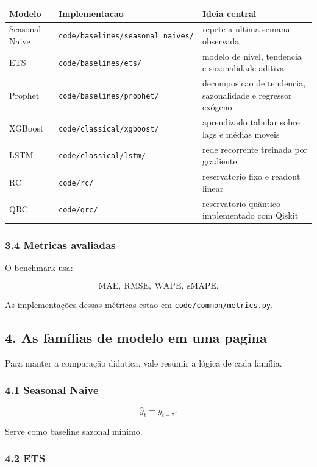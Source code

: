 \documentclass[12pt]{article}
\begin{document}
\begin{longtable}[]{@{}lll@{}}
\toprule\noalign{}
Modelo & Implementacao & Ideia central \\
\midrule\noalign{}
\endhead
\bottomrule\noalign{}
\endlastfoot
Seasonal Naive & \texttt{code/baselines/seasonal\_naives/} & repete a ultima semana observada \\
ETS & \texttt{code/baselines/ets/} & modelo de nivel, tendencia e sazonalidade aditiva \\
Prophet & \texttt{code/baselines/prophet/} & decomposicao de tendencia, sazonalidade e regressor exógeno \\
XGBoost & \texttt{code/classical/xgboost/} & aprendizado tabular sobre lags e médias moveis \\
LSTM & \texttt{code/classical/lstm/} & rede recorrente treinada por gradiente \\
RC & \texttt{code/rc/} & reservatorio fixo e readout linear \\
QRC & \texttt{code/qrc/} & reservatorio quântico implementado com Qiskit \\
\end{longtable}

\subsubsection{3.4 Metricas avaliadas}\label{34-metricas-avaliadas}

O benchmark usa:

\[
\mathrm{MAE},\ \mathrm{RMSE},\ \mathrm{WAPE},\ \mathrm{sMAPE}.
\]

As implementações dessas métricas estao em \texttt{code/common/metrics.py}.

\subsection{4. As famílias de modelo em uma pagina}\label{4-as-famuxedlias-de-modelo-em-uma-pagina}

Para manter a comparação didatica, vale resumir a lógica de cada família.

\subsubsection{4.1 Seasonal Naive}\label{41-seasonal-naive}

\[
\hat{y}_t = y_{t-7}.
\]

Serve como baseline sazonal mínimo.

\subsubsection{4.2 ETS}\label{42-ets}
\end{document}
